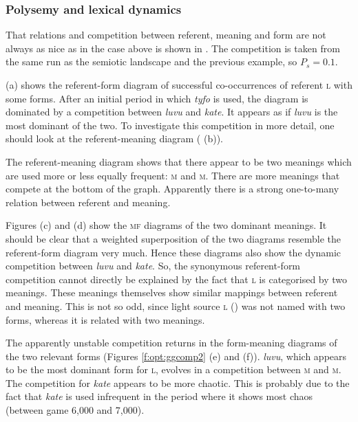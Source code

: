 \subsubsection{Polysemy and lexical dynamics}

That relations and competition between referent, meaning and form are not always as nice as in the case above is shown in . The competition is taken from the same run as the semiotic landscape and the previous example, so $P_s=0.1$.

 (a) shows the referent-form diagram of successful co-occurrences of referent \textsc{l} with some forms. After an initial period in which {\it tyfo} is used, the diagram is dominated by a competition between {\it luvu} and {\it kate}. It appears as if {\it luvu} is the most dominant of the two. To investigate this competition in more detail, one should look at the referent-meaning diagram ( (b)).

The referent-meaning diagram shows that there appear to be two meanings which are used more or less equally frequent: \textsc{m} and \textsc{m}. There are more meanings that compete at the bottom of the graph. Apparently there is a strong one-to-many relation between referent and meaning. 

Figures (c) and (d) show the {\scshape mf} diagrams of the two dominant meanings. It should be clear that a weighted superposition of the two diagrams resemble the referent-form diagram very much. Hence these diagrams also show the dynamic competition between {\it luvu} and {\it kate}. So, the synonymous referent-form competition cannot directly be explained by the fact that \textsc{l} is categorised by two meanings. These meanings themselves show similar mappings between referent and meaning. This is not so odd, since light source \textsc{l} () was not named with two forms, whereas it is related with two meanings.

The apparently unstable competition returns in the form-meaning diagrams of the two relevant forms (Figures \ref{f:opt:ggcomp2} (e) and (f)). {\it luvu}, which appears to be the most dominant form for \textsc{l}, evolves in a competition between \textsc{m} and \textsc{m}. The competition for {\it kate} appears to be more chaotic. This is probably due to the fact that {\it kate} is used infrequent in the period where it shows most chaos (between game 6,000 and 7,000).

